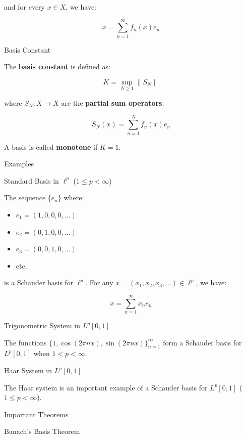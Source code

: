 \documentclass[aps,preprint]{revtex4}
\newenvironment{answer}
  {\begin{tcolorbox}[colback=green!5!white,colframe=green!75!black,title=Answer]}
  {\end{tcolorbox}}
\begin{document}
\begin{answer}
and for every $x \in X$, we have:

\begin{equation*}
x = \sum_{n=1}^\infty f_n(x) e_n
\end{equation*}

Basis Constant

The \textbf{basis constant} is defined as:

\begin{equation*}
K = \sup_{N \geq 1} \left\| S_N \right\|
\end{equation*}

where $S_N: X \to X$ are the \textbf{partial sum operators}:

\begin{equation*}
S_N(x) = \sum_{n=1}^N f_n(x) e_n
\end{equation*}

A basis is called \textbf{monotone} if $K = 1$.

Examples

Standard Basis in $\ell^p$ ($1 \leq p < \infty$)

The sequence $\{e_n\}$ where:

\begin{itemize}
\item $e_1 = (1, 0, 0, 0, \dots)$

\item $e_2 = (0, 1, 0, 0, \dots)$

\item $e_3 = (0, 0, 1, 0, \dots)$

\item etc.
\end{itemize}

is a Schauder basis for $\ell^p$. For any $x = (x_1, x_2, x_3, \dots) \in
\ell^p$, we have:

\begin{equation*}
x = \sum_{n=1}^\infty x_n e_n
\end{equation*}

Trigonometric System in $L^p[0,1]$

The functions $\{1, \cos(2\pi nx), \sin(2\pi nx)\}_{n=1}^\infty$ form a
Schauder basis for $L^p[0,1]$ when $1 < p < \infty$.

Haar System in $L^p[0,1]$

The Haar system is an important example of a Schauder basis for $L^p[0,1]$ ($%
1 \leq p < \infty$).

Important Theorems

Banach's Basis Theorem


\end{answer}
\end{document}
